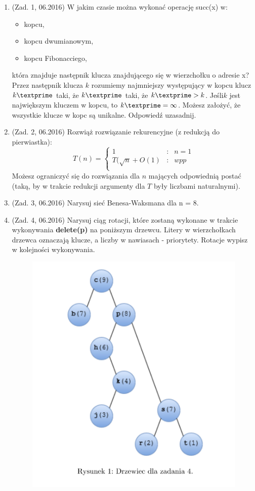 \documentclass[10pt]{article}%
\begin{document}
\begin{enumerate}
\item (Zad. 1, 06.2016) W jakim czasie można wykonać operację succ(x) w:
\begin{itemize}
\item kopcu,
\item kopcu dwumianowym,
\item kopcu Fibonacciego,
\end{itemize}
która znajduje następnik klucza znajdującego się w wierzchołku o adresie x? Przez następnik klucza $k$ rozumiemy najmniejszy występujący w kopcu klucz $k\textprime$ taki, że $k\textprime$ taki, że $ k\textprime > k$. Jeśli$k$ jest największym kluczem w kopcu, to $k\textprime = \infty$. Możesz założyć, że wszystkie klucze w kopc są unikalne. Odpowiedź uzasadnij.
\item (Zad. 2, 06.2016) Rozwiąż rozwiązanie rekurencyjne (z redukcją do pierwiastka):
$$T(n) = \left\{\begin{array}{rcl}
1&:&n=1\\
T(\sqrt{n}+O(1)&:&wpp\\
\end{array} \right.$$
Możesz ograniczyć się do rozwiązania dla $n$ mających odpowiednią postać (taką, by w trakcie redukcji argumenty dla $T$ były liczbami naturalnymi).
\item (Zad. 3, 06.2016) Narysuj sieć Benesa-Waksmana dla n = 8.
\item (Zad. 4, 06.2016) Narysuj ciąg rotacji, które zostaną wykonane w trakcie wykonywania \textbf{delete(p)} na poniższym drzewcu. Litery w wierzchołkach drzewca oznaczają klucze, a liczby w nawiasach - priorytety. Rotacje wypisz w kolejności wykonywania.
\begin{figure}[H]
\includegraphics[scale=0.8]{z40616.png}

\end{figure}
\end{enumerate}
\end{document}
